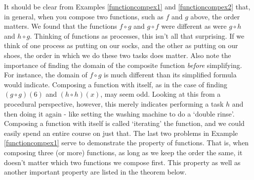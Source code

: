 It should be clear from Examples \ref{functioncompex1} and \ref{functioncompex2} that, in general, when you compose two functions, such as $f$ and $g$ above, the order matters.    We found that the functions $f \circ g$ and $g \circ f$ were different as were $g \circ h$ and $h \circ g$.  Thinking of functions as processes, this isn't all that surprising.  If we think of one process as putting on our socks, and the other as putting on our shoes, the order in which we do these two tasks does matter. Also note the importance of finding the domain of the composite function \textit{before} simplifying.  For instance, the domain  of $f \circ g$ is much different than its simplified formula would indicate.  Composing a function with itself, as in the case of finding $(g\circ g)(6)$ and $(h \circ h)(x)$, may seem odd.  Looking at this from a procedural perspective, however, this merely indicates performing a task $h$ and then doing it again - like setting the washing machine to do a `double rinse'. Composing a function with itself is called `iterating' the function, and we could easily spend an entire course on just that. The last two problems in Example \ref{functioncompex1} serve to demonstrate the   property of functions.  That is, when composing three (or more) functions, as long as we keep the order the same, it doesn't matter which two functions we compose first. This property as well as another important property are listed in the theorem below.


\medskip


